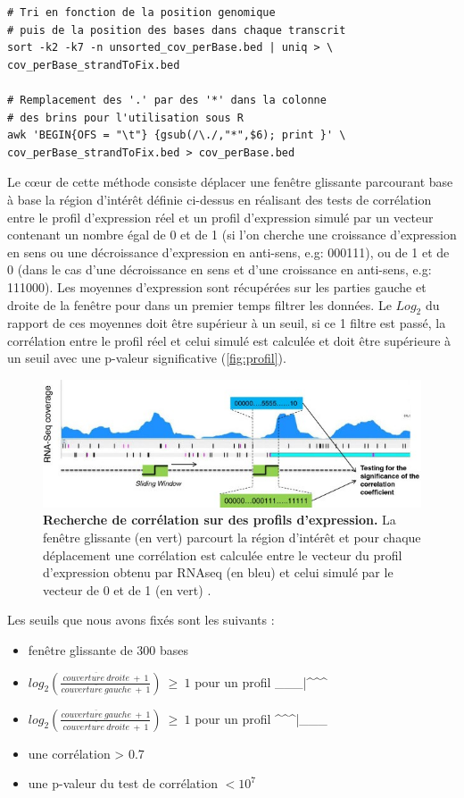\documentclass[12pt,a4paper]{report}
\begin{document}
\begin{onehalfspace}
\begin{lstlisting}[frame=single]
# Tri en fonction de la position genomique 
# puis de la position des bases dans chaque transcrit
sort -k2 -k7 -n unsorted_cov_perBase.bed | uniq > \
cov_perBase_strandToFix.bed

# Remplacement des '.' par des '*' dans la colonne
# des brins pour l'utilisation sous R
awk 'BEGIN{OFS = "\t"} {gsub(/\./,"*",$6); print }' \
cov_perBase_strandToFix.bed > cov_perBase.bed
\end{lstlisting}
Le cœur de cette méthode consiste déplacer une fenêtre glissante parcourant base à base la région d'intérêt définie ci-dessus en réalisant des tests de corrélation entre le profil d'expression réel et un profil d'expression simulé par un vecteur contenant un nombre égal de 0 et de 1 (si l'on cherche une croissance d'expression en sens ou une décroissance d'expression en anti-sens, e.g: 000111), ou de 1 et de 0 (dans le cas d'une décroissance en sens et d'une croissance en anti-sens, e.g: 111000). Les moyennes d'expression sont récupérées sur les parties gauche et droite de la fenêtre pour dans un premier temps filtrer les données. Le $Log_2$ du rapport de ces moyennes doit être supérieur à un seuil, si ce 1 filtre est passé, la corrélation entre le profil réel et celui simulé est calculée et doit être supérieure à un seuil avec une p-valeur significative (\autoref{fig:profil}). 

\begin{figure}[ht]
\centerline{\includegraphics[scale=0.6]{figures/profil.jpg}}
\caption{\textbf{Recherche de corrélation sur des profils d'expression.} La fenêtre glissante (en vert) parcourt la région d'intérêt et pour chaque déplacement une corrélation est calculée entre le vecteur du profil d'expression obtenu par RNAseq (en bleu) et celui simulé par le vecteur de 0 et de 1 (en vert) \citep{Fortino2014}.}
\label{fig:profil} 
\end{figure}

Les seuils que nous avons fixés sont les suivants : 
\begin{itemize}[label=$\bullet$]
\item fenêtre glissante de 300 bases
\item $log_2(\frac{\overline{couverture~droite}~+~1}{\overline{couverture~gauche}~+~1})~\geq~1$ pour un profil \_\_\_|\^{ }\^{ }\^{ }
\item $log_2(\frac{\overline{couverture~gauche}~+~1}{\overline{couverture~droite}~+~1})~\geq~1$ pour un profil \^{ }\^{ }\^{ }|\_\_\_
\item une corrélation > 0.7
\item une p-valeur du test de corrélation $< 10^7$
\end{itemize}


\end{onehalfspace}
\end{document}
